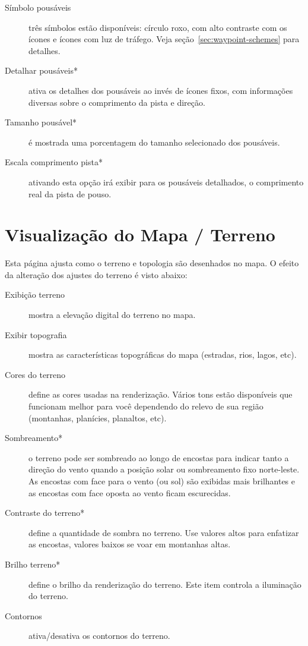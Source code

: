 \begin{description}
\item[Símbolo pousáveis]  \label{conf:waypointicons} três símbolos estão disponíveis: círculo roxo, com alto contraste com os ícones e ícones com luz de tráfego. Veja seção~\ref{sec:waypoint-schemes} para detalhes.
\item[Detalhar pousáveis*]  ativa os detalhes dos pousáveis ao invés de ícones fixos, com informações diversas sobre o comprimento da pista e direção.
\item[Tamanho pousável*]  é mostrada uma porcentagem do tamanho selecionado dos pousáveis.
\item[Escala comprimento pista*]  ativando esta opção irá exibir para os pousáveis detalhados, o comprimento real da pista de pouso.
\end{description}


\section{Visualização do Mapa / Terreno}\label{sec:terrain-display}

Esta página ajusta como o terreno e topologia são desenhados no mapa. 
O efeito da alteração dos ajustes do terreno é visto abaixo:

\begin{description}
\item[Exibição terreno]  mostra a elevação digital do terreno no mapa.
\item[Exibir topografia]  mostra as características topográficas do mapa (estradas, rios, lagos, etc).
\item[Cores do terreno]  define as cores usadas na renderização.  Vários tons estão disponíveis que funcionam melhor para você dependendo do relevo de sua região (montanhas, planícies, planaltos, etc).
\item[Sombreamento*]  \label{conf:shading} o terreno pode ser sombreado ao longo de encostas para indicar tanto a direção do vento quando a posição solar ou sombreamento fixo norte-leste.  As encostas com face para o vento (ou sol) são exibidas mais brilhantes e as encostas com face oposta ao vento ficam escurecidas.
\item[Contraste do terreno*]  define a quantidade de sombra no terreno.  Use valores altos para enfatizar as encostas, valores baixos se voar em montanhas altas.  
\item[Brilho terreno*]  define o brilho da renderização do terreno.  Este item controla a iluminação do terreno.
\item[Contornos] ativa/desativa os contornos do terreno. 
\end{description}


